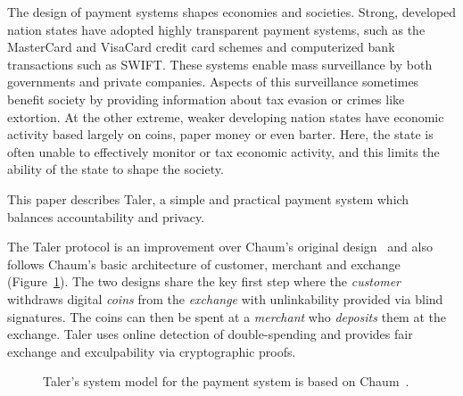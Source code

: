 \documentclass{llncs}
\begin{document}
The design of payment systems shapes economies and societies.  Strong,
developed nation states have adopted highly transparent payment systems,
such as the MasterCard and VisaCard credit card schemes and computerized
bank transactions such as SWIFT.  These systems enable mass surveillance
by both governments and private companies.  Aspects of this surveillance
sometimes benefit society by providing information about tax evasion or
crimes like extortion.
%
%
At the other extreme, weaker developing nation states have economic
activity based largely on coins, paper money or even barter.  Here,
the state is often unable to effectively monitor or tax economic
activity, and this limits the ability of the state to shape the
society.
%
%

This paper describes Taler, a simple and practical payment system
which balances accountability and privacy.

The Taler protocol is an improvement over Chaum's original
design~\cite{chaum1983blind} and also follows Chaum's basic
architecture of customer, merchant and exchange
(Figure~\ref{fig:cmm}).  The two designs share the key first step
where the {\em customer} withdraws digital {\em coins} from the {\em
  exchange} with unlinkability provided via blind signatures.  The
coins can then be spent at a {\em merchant} who {\em deposits} them at
the exchange.  Taler uses online detection of double-spending and
provides fair exchange and exculpability via cryptographic proofs.

\begin{figure}[h]
\centering
{}
\caption{Taler's system model for the payment system is based on Chaum~\cite{chaum1983blind}.}
\label{fig:cmm}
\end{figure}
\end{document}
